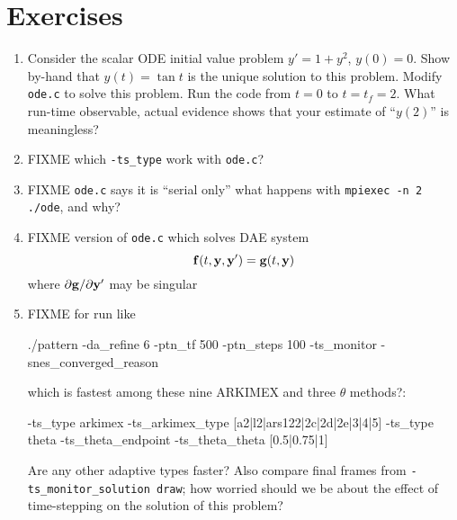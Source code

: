 \section{Exercises}

\renewcommand{\labelenumi}{\arabic{chapter}.\arabic{enumi}\quad}
\renewcommand{\labelenumii}{(\alph{enumii})}
\begin{enumerate}
\item \label{exer:ts:tan}  Consider the scalar ODE initial value problem $y'=1+y^2$, $y(0)=0$.  Show by-hand that $y(t)=\tan t$ is the unique solution to this problem.  Modify \texttt{ode.c} to solve this problem.  Run the code from $t=0$ to $t=t_f=2$.  What run-time observable, actual evidence shows that your estimate of ``$y(2)$'' is meaningless?
\item FIXME which \texttt{-ts\_type} work with \texttt{ode.c}?
\item FIXME \texttt{ode.c} says it is ``serial only''  what happens with \texttt{mpiexec -n 2 ./ode}, and why?
\item FIXME version of \texttt{ode.c} which solves DAE system
    $$\mathbf{f}(t,\mathbf{y},\mathbf{y}') = \mathbf{g}(t,\mathbf{y})$$
where $\partial \mathbf{g}/\partial \mathbf{y}'$ may be singular
\item FIXME for run like
\begin{cline}
./pattern -da_refine 6 -ptn_tf 500 -ptn_steps 100 -ts_monitor -snes_converged_reason
\end{cline}
which is fastest among these nine ARKIMEX and three $\theta$ methods?:
\begin{code}
-ts_type arkimex -ts_arkimex_type [a2|l2|ars122|2c|2d|2e|3|4|5]
-ts_type theta -ts_theta_endpoint -ts_theta_theta [0.5|0.75|1]
\end{code}
Are any other adaptive \pTS types faster?  Also compare final frames from \texttt{-ts\_monitor\_solution draw}; how worried should we be about the effect of time-stepping on the solution of this problem?
\end{enumerate}
